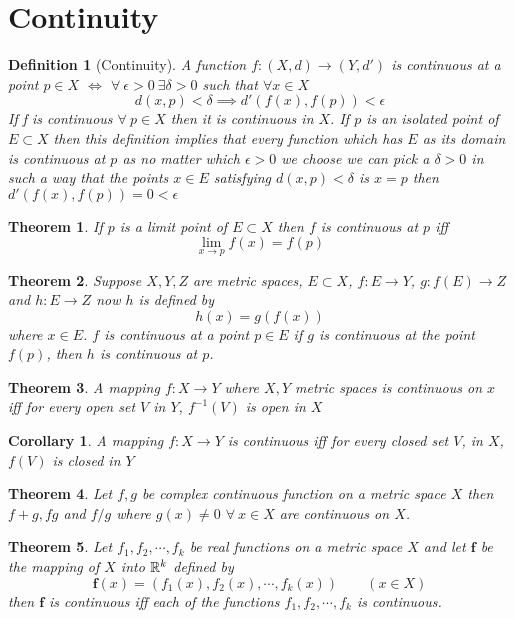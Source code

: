 \documentclass{article}
\newtheorem{theorem}{Theorem}[section]
\newtheorem{defn}{Definition}[section]
\newtheorem{corollary}{Corollary}[theorem]
\begin{document}
\section{Continuity}
\begin{defn}[Continuity]
A  function $f:(X,d)\to(Y,d')$ is continuous at a point $p \in X$ $\iff$ $\forall \ \epsilon >0 \ \exists \delta  >0 $ such that  $\forall x\in X$ \[d(x,p)<\delta \implies d'(f(x),f(p)) <\epsilon \]	
If f is continuous $\forall \ p \in X $  then it is continuous in $X$. If $p$ is an isolated point of $E\subset X$ then this definition implies that every function which has $E$ as its domain is continuous at $p$ as no matter which $\epsilon>0$ we choose we can pick a $\delta>0$ in such a way that the points $x\in E$ satisfying $d(x,p)< \delta $ is $x=p$ then $d'(f(x),f(p))=0<\epsilon$
\end{defn}
\begin{theorem}
	If $p$ is a limit point of $E\subset X$ then $f$ is continuous at $p$ iff $$\lim\limits_{x\to p} f(x)=f(p)$$ 
\end{theorem}
\begin{theorem}
	Suppose $X,Y,Z$ are metric spaces, $E\subset X$, $f:E\to Y$, $g:f(E)\to Z$ and $h:E\to Z$ now $h $ is defined by $$h(x)=g(f(x))$$where $x\in E$. $f$ is continuous at a point $p\in E$ if $g$ is continuous at the point $f(p)$, then $h$ is continuous at $p$. 
\end{theorem}
\begin{theorem}
	A mapping $f:X\to Y$ where $X,Y$ metric spaces is continuous on $x$ iff for every open set $V$ in $Y$, $f^{-1}(V)$ is open in $X$
\end{theorem}
\begin{corollary}
	A mapping $f:X\to Y$ is continuous  iff for every closed set $V$, in $X$, $f(V)$ is closed in $Y$
\end{corollary}
\begin{theorem}
	Let $f,g$ be complex continuous function on a metric space $X$ then $f+g, fg$  and $ f/g$ where $g(x)\neq 0$ $\forall \ x\in X$  are continuous on $X$.
\end{theorem}
\begin{theorem}
	Let $f_1,f_2,\cdots, f_k$ be real functions on a metric space $X$ and let $\boldsymbol{f}$ be the mapping of $X$  into $\mathbb{R}^k$ defined by $$\boldsymbol{f}(x)=(f_1(x),f_2(x),\cdots,f_k(x))\qquad (x\in X)$$ then $\boldsymbol{f}$ is continuous iff each of the functions $f_1,f_2,\cdots, f_k$ is continuous. 
\end{theorem}
\end{document}
